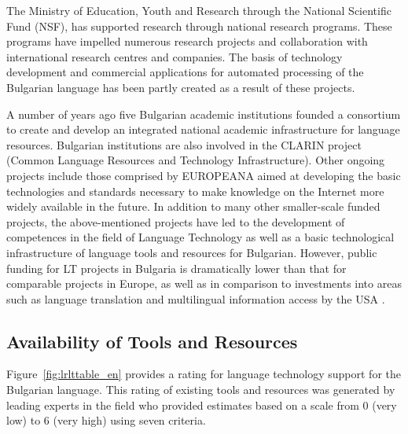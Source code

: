 \documentclass[]{../../metanetpaper}
\begin{document}
\begin{multicols}{2}
The Ministry of Education, Youth and Research through the National Scientific Fund (NSF), has supported research through national research programs. These programs have impelled numerous research projects and collaboration with international research centres and companies. The basis of technology development and commercial applications for automated processing of the Bulgarian language has been partly created as a result of these projects.

A number of years ago five Bulgarian academic institutions founded a consortium to create and develop an integrated national academic infrastructure for language resources. Bulgarian institutions are also involved in the CLARIN project (Common Language Resources and Technology Infrastructure). Other ongoing projects include those comprised by EUROPEANA aimed at developing the basic technologies and standards necessary to make knowledge on the Internet more widely available in the future. In addition to many other smaller-scale funded projects, the above-mentioned projects have led to the development of competences in the field of Language Technology as well as a basic technological infrastructure of language tools and resources for Bulgarian. However, public funding for LT projects in Bulgaria is dramatically lower than that for comparable projects in Europe, as well as in comparison to investments into areas such as language translation and multilingual information access by
  the USA \cite{sprachtech}.  
  
\subsection{Availability of Tools and Resources}

Figure~\ref{fig:lrlttable_en} provides a rating for language technology support for the Bulgarian language. This rating of existing tools and resources was generated by leading experts in the field who provided estimates based on a scale from 0 (very low) to 6 (very high) using seven criteria.


\end{multicols}
\end{document}
